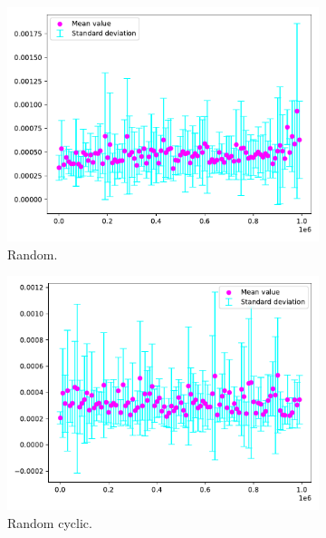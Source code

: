\begin{figure}[H]
    \centering
    \begin{subfigure}[b]{.24\textwidth}
        \centering
        \includegraphics[width=\textwidth]{figures/kappa/random_function_of_kappa}
        \caption{Random.}\label{fig:kappaa}
    \end{subfigure}
    \hfill
    \begin{subfigure}[b]{.24\textwidth}
        \centering
        \includegraphics[width=\textwidth]{figures/kappa/random_cyclic_function_of_kappa}
        \caption{Random cyclic.}\label{fig:kappab}
    \end{subfigure}
    \hfill
    \begin{subfigure}[b]{.24\textwidth}

\end{subfigure}
\end{figure}
